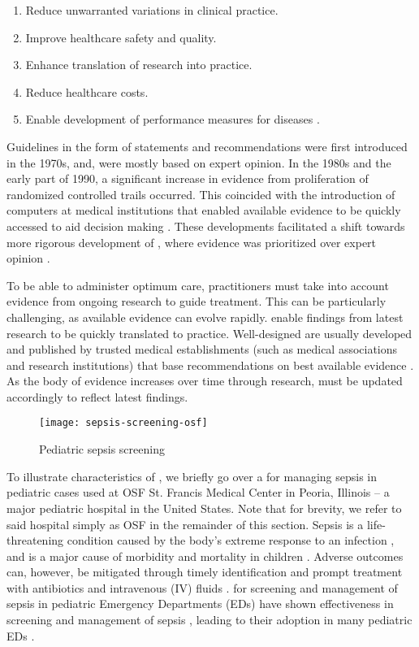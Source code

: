 \begin{enumerate}
  \item Reduce unwarranted variations in clinical practice.
  \item Improve healthcare safety and quality.
  \item Enhance translation of research into practice.
  \item Reduce healthcare costs.
  \item Enable development of performance measures for diseases
    \cite{GuerraInjury23, BusseWHO19}.
\end{enumerate}

Guidelines in the form of statements and recommendations
were first introduced in the 1970s,
and, were mostly based on expert opinion.
In the 1980s and the early part of 1990,
a significant increase in evidence from proliferation of randomized controlled
trails occurred. This coincided with the introduction
of computers at medical institutions that enabled available evidence
to be quickly accessed to aid decision making \cite{GuyattAMA92,SackettJPH95}.
These developments facilitated a shift towards more rigorous
development of \BPGs{}, where evidence was prioritized over expert opinion
\cite{GuerraInjury23}.

To be able to administer optimum care, practitioners must take into
account evidence from ongoing research to guide treatment. This
can be particularly challenging, as available evidence can evolve rapidly.
\BPGs{} enable findings from latest research to be quickly translated to
practice. Well-designed \BPGs{} are usually developed and published by trusted medical
establishments (such as medical associations and research institutions)
that base recommendations on best available evidence \cite{GuerraInjury23}.
As the body of evidence increases over time through research,
\BPGs{} must be updated accordingly to reflect latest findings.

\begin{figure}[b!]
  \centering
  \texttt{[image: sepsis-screening-osf]}
  \caption{Pediatric sepsis screening \BPG{}}\label{fig:sepsis-screening}
\end{figure}

To illustrate characteristics of \BPGs{}, we briefly go over a \BPG{}
for managing sepsis in pediatric cases used at OSF St. Francis Medical Center
in Peoria, Illinois -- a major pediatric hospital in the United States. Note
that for brevity, we refer to said hospital simply as OSF in the remainder of
this section.
Sepsis is a life-threatening condition caused by the body's extreme response to
an infection \cite{RhodesICM17}, and is
a major cause of morbidity and mortality in children \cite{Eisenberg2021JP}.
Adverse outcomes can, however, be mitigated through timely
identification and prompt treatment with antibiotics and
intravenous (IV) fluids \cite{Weiss2014CCM,Evans2018JAMA}.
\BPGs{} for screening and management of sepsis in pediatric Emergency
Departments (EDs) have shown effectiveness in screening and management of sepsis \cite{Eisenberg2021JP},
leading to their adoption in many pediatric EDs \cite{Balamuth2017EM,Sepanski2014FP}.

